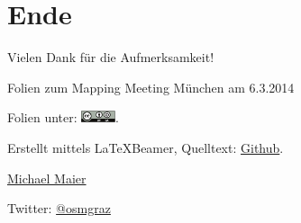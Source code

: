 \documentclass{beamer}
\begin{document}
\section{Ende}

\begin{frame}{Vielen Dank für die Aufmerksamkeit!}

  Folien zum Mapping Meeting München am 6.3.2014
\vspace{1cm}

Folien unter: \includegraphics[width=1cm]{cc-by-sa.pdf}.
\vspace{1cm}

Erstellt mittels \LaTeX Beamer, Quelltext: \href{https://github.com/species/vortrag-osm-mmm}{Github}.
\vspace{1cm}

\href{mailto:michael.maier@student.tugraz.at}{Michael Maier}

Twitter: \href{https://twitter.com/osmgraz}{@osmgraz}
\end{frame}
\end{document}
